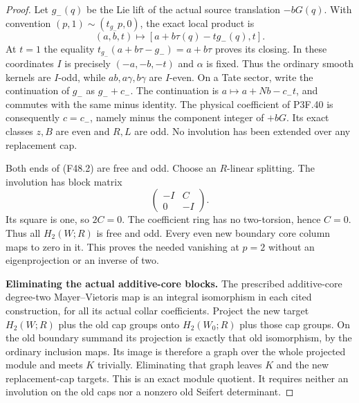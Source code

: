 \begin{proof}
Let $g_-(q)$ be the Lie lift of the actual source translation
$-bG(q)$. With convention
$(p,1)\sim(t_{g_-}p,0)$, the exact local product is
\[
        (a,b,t)\longmapsto[a+b\tau(q)-t g_-(q),t].              \tag{F48.3}
\]
At $t=1$ the equality
$t_{g_-}(a+b\tau-g_-)=a+b\tau$ proves its closing.
In these coordinates $I$ is precisely $(-a,-b,-t)$ and
$\alpha$ is fixed. Thus the ordinary smooth kernels are
$I$-odd, while $ab,a\gamma,b\gamma$ are $I$-even.
On a Tate sector, write the continuation of $g_-$ as
$g_-+c_-$. The continuation is
$a\mapsto a+Nb-c_-t$, and commutes with the same minus
identity. The physical coefficient of P3F.40 is consequently
$c=c_-$, namely minus the component integer of $+bG$.
Its exact classes $z,B$ are even and $R,L$ are odd.
No involution has been extended over any replacement cap.

Both ends of (F48.2) are free and odd. Choose an $R$-linear
splitting. The involution has block matrix
\[
                           \begin{pmatrix}-I&C\\0&-I\end{pmatrix}.
\]
Its square is one, so $2C=0$. The coefficient ring has no
two-torsion, hence $C=0$. Thus all $H_2(W;R)$ is free and
odd. Every even new boundary core column maps to zero in it.
This proves the needed vanishing at $p=2$ without an
eigenprojection or an inverse of two.

\par\medskip\noindent\textbf{Eliminating the actual additive-core blocks.}
The prescribed additive-core degree-two Mayer--Vietoris map
is an integral isomorphism in each cited construction, for
all its actual collar coefficients. Project the new target
$H_2(W;R)$ plus the old cap groups onto $H_2(W_0;R)$ plus
those cap groups. On the old boundary summand its projection
is exactly that old isomorphism, by the ordinary inclusion
maps. Its image is therefore a graph over the whole projected
module and meets $K$ trivially. Eliminating that graph leaves
$K$ and the new replacement-cap targets. This is an exact
module quotient. It requires neither an involution on the old
caps nor a nonzero old Seifert determinant.


\end{proof}
